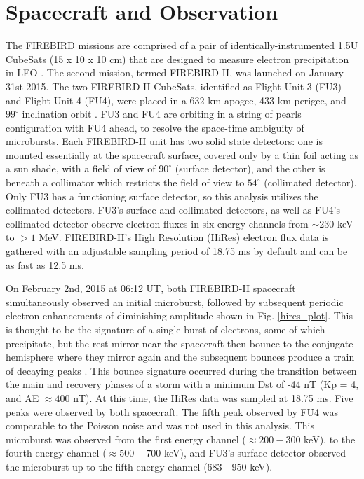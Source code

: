 \section{Spacecraft and Observation} \label{obs} %
The FIREBIRD missions are comprised of a pair of identically-instrumented 1.5U CubeSats (15 x 10 x 10 cm) that are designed to measure electron precipitation in LEO \citep{Spence2012, Klumpar2015}. The second mission, termed FIREBIRD-II, was launched on January 31st 2015.  The two FIREBIRD-II CubeSats, identified as Flight Unit 3 (FU3) and Flight Unit 4 (FU4), were placed in a 632 km apogee, 433 km perigee, and $99^{\circ}$ inclination orbit \citep{Crew2016}. FU3 and FU4 are orbiting in a string of pearls configuration with FU4 ahead, to resolve the space-time ambiguity of microbursts. Each FIREBIRD-II unit has two solid state detectors: one is mounted essentially at the spacecraft surface, covered only by a thin foil acting as a sun shade, with a field of view of $90^{\circ}$ (surface detector), and the other is beneath a collimator which restricts the field of view to $54^{\circ}$ (collimated detector). Only FU3 has a functioning surface detector, so this analysis utilizes the collimated detectors. FU3's surface and collimated detectors, as well as FU4's collimated detector observe electron fluxes in six energy channels from $\sim 230$ keV to $> 1$ MeV. FIREBIRD-II's High Resolution (HiRes) electron flux data is gathered with an adjustable sampling period of 18.75 ms by default and can be as fast as 12.5 ms. 

On February 2nd, 2015 at 06:12 UT, both FIREBIRD-II spacecraft simultaneously observed an initial microburst, followed by subsequent periodic electron enhancements of diminishing amplitude shown in Fig. \ref{hires_plot}. This is thought to be the signature of a single burst of electrons, some of which precipitate, but the rest mirror near the spacecraft then bounce to the conjugate hemisphere where they mirror again and the subsequent bounces produce a train of decaying peaks \citep{Blake1996, Thorne2005}. This bounce signature occurred during the transition between the main and recovery phases of a storm with a minimum Dst of -44 nT (Kp = 4, and AE ${\approx 400}$ nT). At this time, the HiRes data was sampled at 18.75 ms. Five peaks were observed by both spacecraft. The fifth peak observed by FU4 was comparable to the Poisson noise and was not used in this analysis. This microburst was observed from the first energy channel ($\approx 200-300$ keV), to the fourth energy channel ($\approx 500-700$ keV), and FU3's surface detector observed the microburst up to the fifth energy channel (683 - 950 keV).

